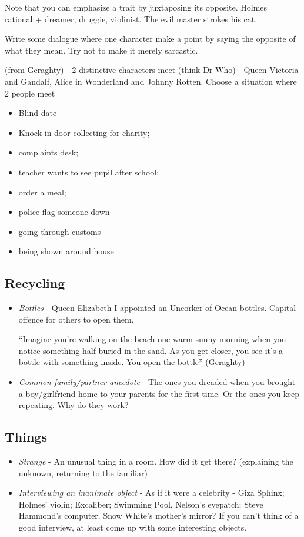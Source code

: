 \documentclass[11pt]{article}
\begin{document}
Note that you can emphasize a trait by juxtaposing its opposite. Holmes= rational + dreamer, druggie, violinist. The evil master strokes his cat.

Write some dialogue where one character make a point by saying the opposite of what they mean. Try not to make it merely sarcastic.


(from Geraghty) -  2 distinctive characters meet (think Dr Who) - Queen Victoria and Gandalf, Alice in Wonderland and Johnny Rotten. Choose a situation where 2 people meet


\begin{itemize}
\item Blind date
\item Knock in door collecting for charity;
\item complaints desk;
\item teacher wants to see pupil after school;
\item order a meal;
\item police flag someone down
\item going through customs
\item being shown around house
\end{itemize}

\subsection*{Recycling}
\begin{itemize}
\item \textit{Bottles} - Queen Elizabeth I appointed an Uncorker of Ocean bottles. Capital offence for others to open them.

``Imagine you're walking on the beach one warm sunny morning when you notice something half-buried in the sand. As you get closer, you see it's a bottle with something inside. You open the bottle'' (Geraghty)


\item \textit{Common family/partner anecdote} -
The ones you dreaded when you brought a boy/girlfriend home to your parents for the first time. Or the ones you keep repeating. Why do they work?
\end{itemize}


\subsection*{Things}
\begin{itemize}
\item \textit{Strange} -
An unusual thing in a room. How did it get there? (explaining the unknown, returning to the familiar)

\item \textit{Interviewing an inanimate object} -
As if it were a celebrity - Giza Sphinx; Holmes' violin; Excaliber; Swimming Pool, Nelson's eyepatch; Steve Hammond's computer. Snow White's mother's mirror? If you can't think of a good interview, at least come up with some interesting objects.
\end{itemize}
\end{document}
